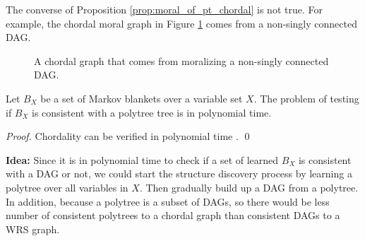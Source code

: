 The converse of Proposition \ref{prop:moral_of_pt_chordal} is not true. For example, the chordal moral graph in Figure \ref{fg:chordal_over_4nodes} comes from a non-singly connected DAG. 
\begin{figure}[H]
\centering
{}
\caption{A chordal graph that comes from moralizing a non-singly connected DAG.}
\label{fg:chordal_over_4nodes}
\end{figure}

\begin{corollary}
Let $B_X$ be a set of Markov blankets over a variable set $X$. The problem of testing if $B_X$ is consistent with a polytree tree is in polynomial time.
\end{corollary}
\begin{proof}
Chordality can be verified in polynomial time \cite{tarjan1984simple}. \qed
\end{proof}

\textbf{Idea:} Since it is in polynomial time to check if a set of learned $B_X$ is consistent with a DAG or not, we could start the structure discovery process by learning a polytree over all variables in $X$. Then gradually build up a DAG from a polytree. In addition, because a polytree is a subset of DAGs, so there would be less number of consistent polytrees to a chordal graph than consistent DAGs to a WRS graph. 




